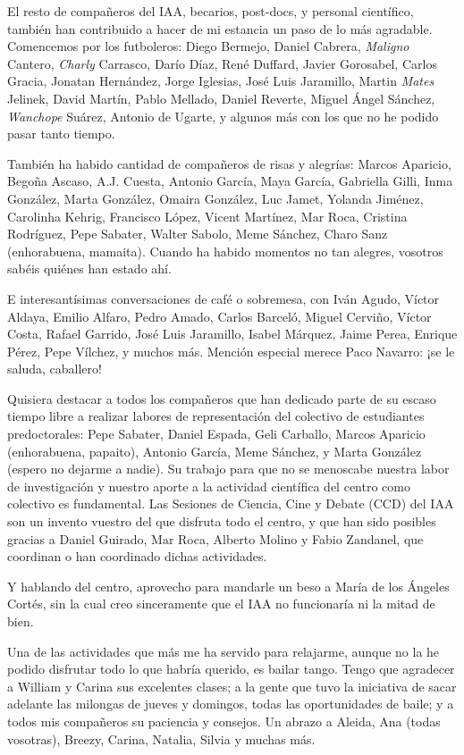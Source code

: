 	 El resto de compañeros del IAA, becarios, post-docs, y
	personal científico, también han contribuido a hacer de mi
	estancia un paso de lo más agradable. Comencemos por los
	futboleros: Diego Bermejo, Daniel Cabrera,
	\emph{Maligno} Cantero, \emph{Charly} Carrasco, Darío Díaz,
	René Duffard, Javier Gorosabel, Carlos
	Gracia, Jonatan Hernández, Jorge Iglesias, José Luis Jaramillo,
	Martin \emph{Mates} Jelinek, David Martín, Pablo Mellado,
	Daniel Reverte, Miguel Ángel Sánchez, \emph{Wanchope} Suárez,
	Antonio de Ugarte, y algunos más con los que no he podido pasar
	tanto tiempo.
	
	 También ha habido cantidad de compañeros de risas y alegrías:
	Marcos Aparicio, Begoña Ascaso, A.J. Cuesta, Antonio García,
	Maya García, Gabriella Gilli, Inma González, Marta González,
	Omaira González, Luc Jamet, Yolanda Jiménez, Carolinha Kehrig,
	Francisco López, Vicent Martínez, Mar Roca, Cristina Rodríguez,
	Pepe Sabater, Walter Sabolo, Meme Sánchez, Charo Sanz
	(enhorabuena, mamaita). Cuando ha habido momentos no tan
	alegres, vosotros sabéis quiénes han estado ahí.
	
	 E interesantísimas conversaciones de café o sobremesa, con
	Iván Agudo, Víctor Aldaya, Emilio Alfaro, Pedro Amado, Carlos
	Barceló, Miguel Cerviño, Víctor Costa, Rafael Garrido, José
	Luis Jaramillo, Isabel Márquez, Jaime Perea, Enrique Pérez,
	Pepe Vílchez, y muchos más. Mención especial merece Paco
	Navarro: ¡se le saluda, caballero!
	
	 Quisiera destacar a todos los compañeros que han dedicado
	parte de su escaso tiempo libre a realizar labores de
	representación del colectivo de estudiantes predoctorales: Pepe
	Sabater, Daniel Espada, Geli Carballo, Marcos Aparicio
	(enhorabuena, papaito), Antonio García, Meme Sánchez, y Marta
	González (espero no dejarme a nadie). Su trabajo para que no se
	menoscabe nuestra labor de investigación y nuestro aporte a la
	actividad científica del centro como colectivo es fundamental.
	Las Sesiones de Ciencia, Cine y Debate (CCD) del IAA son un
	invento vuestro del que disfruta todo el centro, y que han sido
	posibles gracias a Daniel Guirado, Mar Roca, Alberto Molino y
	Fabio Zandanel, que coordinan o han coordinado dichas
	actividades.
	
	 Y hablando del centro, aprovecho para mandarle un beso a María
	de los Ángeles Cortés, sin la cual creo sinceramente que el IAA
	no funcionaría ni la mitad de bien.
	
	 Una de las actividades que más me ha servido para relajarme,
	aunque no la he podido disfrutar todo lo que habría querido, es
	bailar tango. Tengo que agradecer a William y Carina sus
	excelentes clases; a la gente que tuvo la iniciativa de sacar
	adelante las milongas de jueves y domingos, todas las
	oportunidades de baile; y a todos mis compañeros su paciencia y
	consejos. Un abrazo a Aleida, Ana (todas vosotras), Breezy,
	Carina, Natalia, Silvia y muchas más.
	
